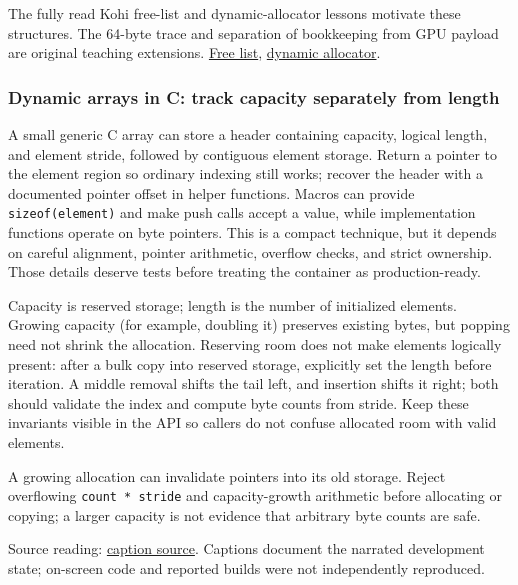 The fully read Kohi free-list and dynamic-allocator lessons motivate these structures. The 64-byte trace and separation of bookkeeping from GPU payload are original teaching extensions. \href{https://www.youtube.com/watch?v=sP7xRUyP3e0}{Free list}, \href{https://www.youtube.com/watch?v=BSBFBWwG8Ds}{dynamic allocator}.

\subsubsection{Dynamic arrays in C: track capacity separately from length}\label{05-engine-i-ch014-dynamic-arrays-in-c-track-capacity-separately-from-length}

\hypertarget{05-engine-i-ch014-dynamic-arrays-in-c-track-capacity-separately-from-length}{}

A small generic C array can store a header containing capacity, logical length, and element stride, followed by contiguous element storage. Return a pointer to the element region so ordinary indexing still works; recover the header with a documented pointer offset in helper functions. Macros can provide \texttt{sizeof(element)} and make push calls accept a value, while implementation functions operate on byte pointers. This is a compact technique, but it depends on careful alignment, pointer arithmetic, overflow checks, and strict ownership. Those details deserve tests before treating the container as production-ready.

Capacity is reserved storage; length is the number of initialized elements. Growing capacity (for example, doubling it) preserves existing bytes, but popping need not shrink the allocation. Reserving room does not make elements logically present: after a bulk copy into reserved storage, explicitly set the length before iteration. A middle removal shifts the tail left, and insertion shifts it right; both should validate the index and compute byte counts from stride. Keep these invariants visible in the API so callers do not confuse allocated room with valid elements.

A growing allocation can invalidate pointers into its old storage. Reject overflowing \texttt{count\ *\ stride} and capacity-growth arithmetic before allocating or copying; a larger capacity is not evidence that arbitrary byte counts are safe.

Source reading: \href{https://www.youtube.com/watch?v=XQ6qljkh2KI}{caption source}. Captions document the narrated development state; on-screen code and reported builds were not independently reproduced.


